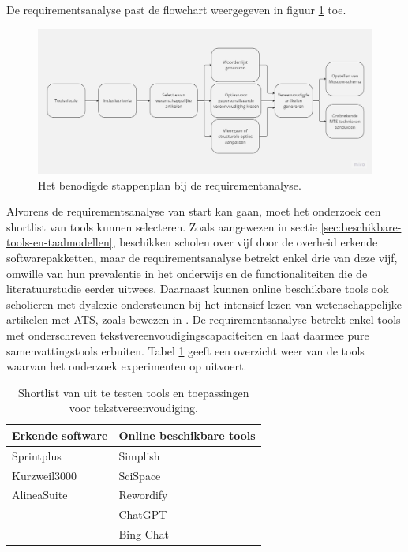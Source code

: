 \medspace

De requirementsanalyse past de flowchart weergegeven in figuur \ref{img:flowchart-requirementsanalyse} toe. 

\begin{figure}[H]
	\includegraphics[width=\linewidth]{img/flowchart-requirementsanalyse.jpg}
	\caption{Het benodigde stappenplan bij de requirementanalyse.}
	\label{img:flowchart-requirementsanalyse}
\end{figure}

Alvorens de requirementsanalyse van start kan gaan, moet het onderzoek een shortlist van tools kunnen selecteren. Zoals aangewezen in sectie \ref{sec:beschikbare-tools-en-taalmodellen}, beschikken scholen over vijf door de overheid erkende softwarepakketten, maar de requirementsanalyse betrekt enkel drie van deze vijf, omwille van hun prevalentie in het onderwijs en de functionaliteiten die de literatuurstudie eerder uitwees. Daarnaast kunnen online beschikbare tools ook scholieren met dyslexie ondersteunen bij het intensief lezen van wetenschappelijke artikelen met ATS, zoals bewezen in \textcite{Bingel2018}. De requirementsanalyse betrekt enkel tools met onderschreven tekstvereenvoudigingscapaciteiten en laat daarmee pure samenvattingstools erbuiten. Tabel \ref{table:shortlist-tools} geeft een overzicht weer van de tools waarvan het onderzoek experimenten op uitvoert.

\begin{center}
	\begin{table}[H]
		\begin{tabular}{ | m{6cm} | m{6cm} | } 
			\hline
			\textbf{Erkende software} & \textbf{Online beschikbare tools} \\
			\hline
			Sprintplus & Simplish \\
			Kurzweil3000 & SciSpace \\ 
			AlineaSuite & Rewordify\\
			& ChatGPT \\
			& Bing Chat\\
			\hline
		\end{tabular}
		\caption{Shortlist van uit te testen tools en toepassingen voor tekstvereenvoudiging.}
		\label{table:shortlist-tools}	
	\end{table}
\end{center}

